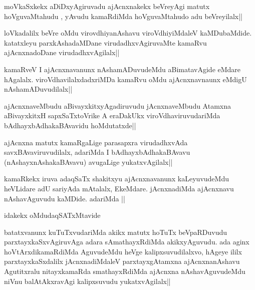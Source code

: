 
\begin{artha}
moVkaSxkekx aDiDxyAgiruvadu ajAcnxnakekx beVreyAgi matutx hoVguvaMtahudu , yAvudu kamaRdiMda hoVguvaMtahudo adu beVreyilalx||
\end{artha}

\begin{artha}
loVkadalilx beVre oMdu virovdhiyanAshavu viroVdhiyiMdaleV kaMDubaMdide. katatxleyu parxkAshadaMDane virudadhxvAgiruvaMte kamaRvu ajAcnxnadoDane virudadhxvAgilalx||
\end{artha}

\begin{artha}
kamaRveV I ajAcnxnavanunx nAshamADuvudeMdu aBimatavAgide eMdare hAgalalx. viroVdhavilalxdadxriMDa kamaRvu oMdu ajAcnxnavnaunx eMdigU nAshamADuvudilalx||
\end{artha}

\begin{artha}
ajAcnxnaveMbudu aBivayxkitxyAgadiruvudu jAcnxnaveMbudu Atamxna aBivayxkitxH sapxSaTxtoVrike A eraDakUkx viroVdhaviruvudariMda bAdhayxbAdhakaBAvavidu hoMdutatxde||
\end{artha}

\begin{artha}
ajAcnxna matutx kamaRgaLige parasapxra virudadhxvAda savxBAvaviruvudilalx, adariMda I bAdhayxbAdhakaBAvavu (nAshayxnAshakaBAvavu) avugaLige yukatxvAgilalx||
\end{artha}

\begin{artha}
kamaRkekx iruva adaqSaTx shakitxyu ajAcnxnavanunx kaLeyuvudeMdu heVLidare adU sariyAda mAtalalx, EkeMdare. jAcnxnadiMda ajAcnxnavu nAshavAguvudu kaMDide. adariMda ||
\end{artha}

\begin{artha}
idakekx oMdudaqSATxMtavide
\end{artha}

\begin{artha}
batatxvanunx kuTuTxvudariMda akikx matutx hoTuTx beVpaRDuvudu parxtayxkaSxvAgiruvAga adara sAmathayxRdiMda akikxyAguvudu. ada aginx hoVtArxdikamaRdiMda AguvudeMdu heVge kalipxsuvudilalxvo, hAgeye ililx parxtayxkaSxdalilx jAcnxnadiMdaleV parxtayxgAtamxna ajAcnxnanAshavu Agutitxralu nitayxkamaRda smathayxRdiMda ajAcnxna nAshavAguvudeMdu niVnu balAtAkxravAgi kalipxsuvudu yukatxvAgilalx||
\end{artha}

